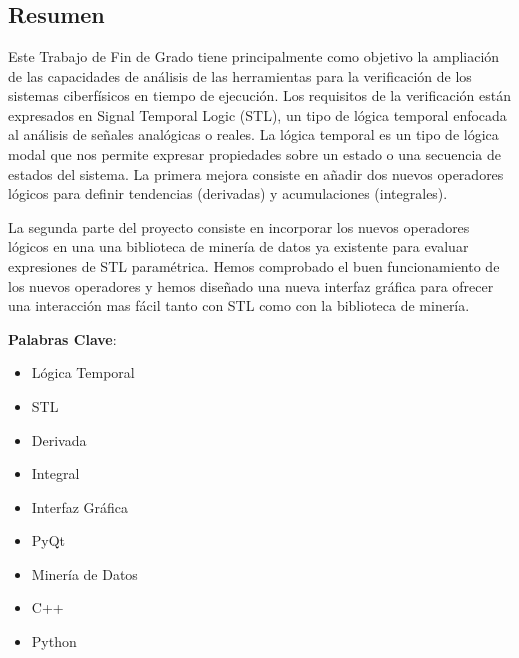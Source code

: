 \chapter*{}

\section*{Resumen}
Este Trabajo de Fin de Grado tiene principalmente como objetivo la ampliación de las capacidades de análisis de las herramientas para la verificación de los sistemas ciberfísicos en tiempo de ejecución. Los requisitos de la verificación están expresados en  Signal Temporal Logic (STL), un tipo de lógica temporal enfocada al análisis de señales analógicas o reales. La lógica temporal es un tipo de lógica modal que nos permite expresar propiedades sobre un estado o una secuencia de estados del sistema. La primera mejora consiste en añadir dos nuevos operadores lógicos para definir tendencias (derivadas) y acumulaciones (integrales).


La segunda parte del proyecto consiste en incorporar los nuevos operadores lógicos en una una biblioteca de minería de datos ya existente para evaluar expresiones de STL paramétrica. Hemos comprobado el buen funcionamiento de los nuevos operadores y hemos diseñado una nueva interfaz gráfica para ofrecer una interacción mas fácil tanto con STL como con la biblioteca de minería.

\textbf{Palabras Clave}:
\begin{itemize}
\item Lógica Temporal
\item STL
\item Derivada
\item Integral
\item Interfaz Gráfica
\item PyQt
\item Minería de Datos 
\item C++
\item Python
\end{itemize}
\newpage

